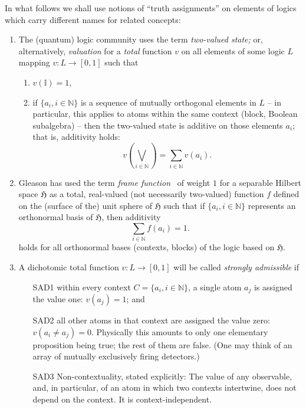 In what follows we shall use notions of ``truth assignments'' on elements of logics which carry different names for related concepts:
\begin{enumerate}
\item
The (quantum) logic community uses the term {\em two-valued state;} or, alternatively, {\em valuation}
for a {\em total} function $v$ on all elements of some logic $L$  mapping
$v: L \rightarrow [0,1]$  such that~\cite[Definition~2.1.1, p.~20]{pulmannova-91}
\begin{enumerate}
\item
$v (\mathbb{I}) = 1$,
\item
if $\{ a_i, i \in \mathbb{N}\}$ is a sequence of mutually orthogonal elements in $L$ -- in particular,  this applies to
atoms within the same context (block, Boolean subalgebra) --
then the two-valued state is additive on those elements $a_i$;  that is, additivity holds:
\begin{equation}
v\left( \bigvee_{i \in \mathbb{N}} \right) = \sum_{i \in \mathbb{N}} v(a_i).
\label{2017-ch-pu-qlff}
\end{equation}
\end{enumerate}

\item
Gleason has used the term {\em frame function}~\cite[p.~886]{Gleason}
of weight $1$ for a separable Hilbert space $\mathfrak{H}$ as a
total,
real-valued (not necessarily two-valued) function $f$ defined on the (surface of the)
unit sphere of $\mathfrak{H}$  such that if
$\{ a_i, i \in \mathbb{N}\}$ represents an orthonormal basis  of  $\mathfrak{H}$, then  additivity
\begin{equation}
 \sum_{i \in \mathbb{N}} f(a_i) = 1.
\label{2017-ch-pu-glff}
\end{equation}
holds for all orthonormal bases
(contexts, blocks) of the logic based on  $\mathfrak{H}$.


\item
A dichotomic total function $v: L \rightarrow [0,1]$  will be called   {\em strongly admissible}
if
\begin{enumerate}
\item[SAD1]  within every context $C = \{ a_i, i \in \mathbb{N}\}$, a single atom $a_j$ is assigned the value one: $v(a_j)=1$;
and
\item[SAD2]   all other atoms in that context are assigned the value zero: $v(a_i\neq a_j )=0$.
Physically this amounts to only one elementary proposition being true; the rest of them are false.
(One may think of an array of mutually exclusively firing detectors.)
\item[SAD3]    Non-contextuality, stated explicitly:
The value of any observable, and, in particular, of an atom in which two contexts intertwine, does not depend on the context. It is context-independent.
\end{enumerate}


\end{enumerate}
